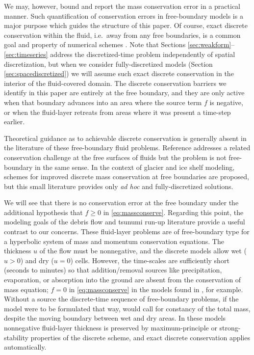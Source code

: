 \documentclass[final,onefignum]{siamart190516}
\begin{document}
We may, however, bound and report the mass conservation error in a practical manner.  Such quantification of conservation errors in free-boundary models is a major purpose which guides the structure of this paper.  Of course, exact discrete conservation within the fluid, i.e.~away from any free boundaries, is a common goal and property of numerical schemes \cite[and references therein]{LeVeque2002}.  Note that Sections \ref{sec:weakform}--\ref{sec:timeseries} address the discretized-time problem independently of spatial discretization, but when we consider fully-discretized models (Section \ref{sec:spacediscretized}) we will assume such exact discrete conservation in the interior of the fluid-covered domain.  The discrete conservation barriers we identify in this paper are entirely at the free boundary, and they are only active when that boundary advances into an area where the source term $f$ is negative, or when the fluid-layer retreats from areas where it was present a time-step earlier.

Theoretical guidance as to achievable discrete conservation is generally absent in the literature of these free-boundary fluid problems.  Reference \cite{IdelsohnOnate2010} addresses a related conservation challenge at the free surfaces of fluids but the problem is not free-boundary in the same sense.  In the context of glacier \cite{JaroschSchoofAnslow2013} and ice shelf \cite{Albrechtetal2011} modeling, schemes for improved discrete mass conservation at free boundaries are proposed, but this small literature provides only \emph{ad hoc} and fully-discretized solutions.

We will see that there is no conservation error at the free boundary under the additional hypothesis that $f\ge 0$ in \eqref{eq:massconserve}.  Regarding this point, the modeling goals of the debris flow \cite{GeorgeIverson2014} and tsunumi run-up \cite{LeVequeetal2011} literature provide a useful contrast to our concerns.  These fluid-layer problems are of free-boundary type for a hyperbolic system of mass and momentum conservation equations.  The thickness $u$ of the flow must be nonnegative, and the discrete models allow wet ($u>0$) and dry ($u=0$) cells.  However, the time-scales are sufficiently short (seconds to minutes) so that addition/removal sources like precipitation, evaporation, or absorption into the ground are absent from the conservation of mass equation; $f=0$ in \eqref{eq:massconserve} in the models found in \cite{GeorgeIverson2014,LeVequeetal2011}, for example.  Without a source the discrete-time sequence of free-boundary problems, if the model were to be formulated that way, would call for constancy of the total mass, despite the moving boundary between wet and dry areas.  In these models nonnegative fluid-layer thickness is preserved by maximum-principle or strong-stability properties of the discrete scheme, and exact discrete conservation applies automatically.
\end{document}
